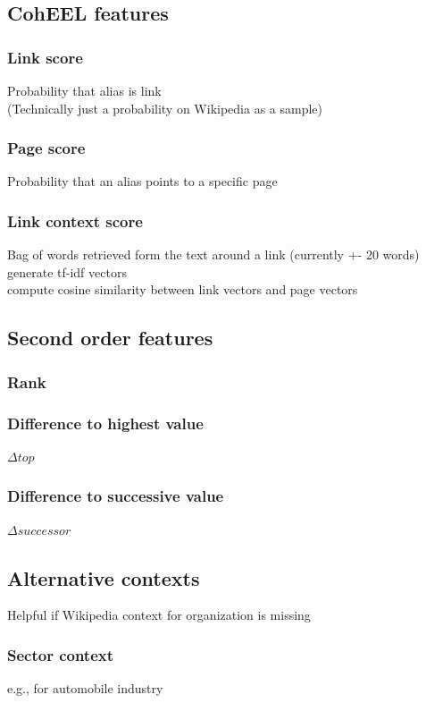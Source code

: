 \documentclass[
        a4paper,     %
        titlepage,   %
        twoside,     %
        parskip      %
        ]{scrartcl} %
\begin{document}
\subsection{CohEEL features}

\subsubsection{Link score}
Probability that alias is link\\
(Technically just a probability on Wikipedia as a sample)

\subsubsection{Page score}
Probability that an alias points to a specific page

\subsubsection{Link context score}
Bag of words retrieved form the text around a link (currently +- 20 words)\\
generate tf-idf vectors\\
compute cosine similarity between link vectors and page vectors

\subsection{Second order features}
\subsubsection{Rank}
\subsubsection{Difference to highest value}
$\Delta top$
\subsubsection{Difference to successive value}
$\Delta successor$

\subsection{Alternative contexts}
Helpful if Wikipedia context for organization is missing
\subsubsection{Sector context}
e.g., for automobile industry
\end{document}
